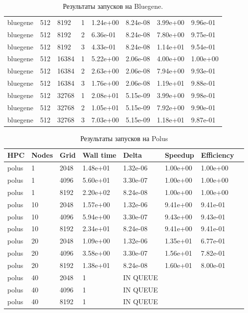 \documentclass[12pt,a4paper]{scrartcl}
\begin{document}
\begin{center}
\begin{table}[h]
\begin{tabular}{l|lllllll}
bluegene & 512 & 8192 & 1 & 1.24e+00 & 8.24e-08 & 3.99e+00 & 9.96e-01 \\
bluegene & 512 & 8192 & 2 & 6.36e-01 & 8.24e-08 & 7.80e+00 & 9.75e-01 \\
bluegene & 512 & 8192 & 3 & 4.33e-01 & 8.24e-08 & 1.14e+01 & 9.54e-01 \\
bluegene & 512 & 16384 & 1 & 5.22e+00 & 2.06e-08 & 4.00e+00 & 1.00e+00 \\
bluegene & 512 & 16384 & 2 & 2.63e+00 & 2.06e-08 & 7.94e+00 & 9.93e-01 \\
bluegene & 512 & 16384 & 3 & 1.76e+00 & 2.06e-08 & 1.19e+01 & 9.88e-01 \\
bluegene & 512 & 32768 & 1 & 2.08e+01 & 5.15e-09 & 3.99e+00 & 9.98e-01 \\
bluegene & 512 & 32768 & 2 & 1.05e+01 & 5.15e-09 & 7.92e+00 & 9.90e-01 \\
bluegene & 512 & 32768 & 3 & 7.03e+00 & 5.15e-09 & 1.18e+01 & 9.87e-01 \\
\hline
\end{tabular}
\caption{Результаты запусков на Bluegene.}
\end{table}
\end{center}

\newpage
\begin{center}
\begin{table}[h]
\begin{tabular}{l|lllllll}
\label{tabular:polus}
HPC & Nodes & Grid & Wall time & Delta & Speedup & Efficiency \\
\hline
polus & 1 & 2048 & 1.48e+01 & 1.32e-06 & 1.00e+00 & 1.00e+00 \\
polus & 1 & 4096 & 5.60e+01 & 3.30e-07 & 1.00e+00 & 1.00e+00 \\
polus & 1 & 8192 & 2.20e+02 & 8.24e-08 & 1.00e+00 & 1.00e+00 \\
polus & 10 & 2048 & 1.57e+00 & 1.32e-06 & 9.41e+00 & 9.41e-01 \\
polus & 10 & 4096 & 5.94e+00 & 3.30e-07 & 9.43e+00 & 9.43e-01 \\
polus & 10 & 8192 & 2.34e+01 & 8.24e-08 & 9.41e+00 & 9.41e-01 \\
polus & 20 & 2048 & 1.09e+00 & 1.32e-06 & 1.35e+01 & 6.77e-01 \\
polus & 20 & 4096 & 3.58e+00 & 3.30e-07 & 1.56e+01 & 7.82e-01 \\
polus & 20 & 8192 & 1.38e+01 & 8.24e-08 & 1.60e+01 & 8.00e-01 \\
polus & 40 & 2048 & 1 & IN QUEUE \\
polus & 40 & 4096 & 1 & IN QUEUE \\
polus & 40 & 8192 & 1 & IN QUEUE \\
\hline

\end{tabular}
\caption{Результаты запусков на Polus}
\end{table}
\end{center}
\end{document}
